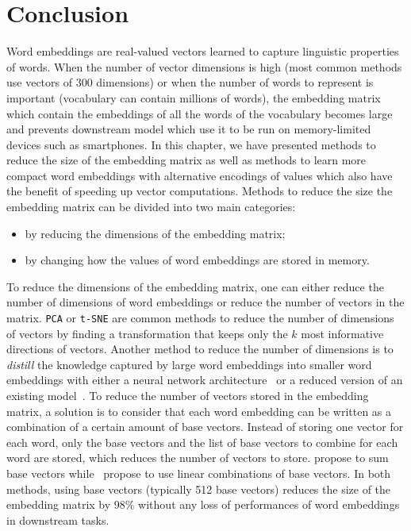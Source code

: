 \section{Conclusion}
  Word embeddings are real-valued vectors learned to capture linguistic
  properties of words. When the number of vector dimensions is high (most common
  methods use vectors of 300 dimensions) or when the number of words to
  represent is important (vocabulary can contain millions of words), the
  embedding matrix which contain the embeddings of all the words of the
  vocabulary becomes large and prevents downstream model which use it to be run
  on memory-limited devices such as smartphones. In this chapter, we have
  presented methods to reduce the size of the embedding matrix as well as
  methods to learn more compact word embeddings with alternative encodings of
  values which also have the benefit of speeding up vector computations. Methods
  to reduce the size the embedding matrix can be divided into two main
  categories:

  \begin{itemize}
    \item by reducing the dimensions of the embedding matrix;
    \item by changing how the values of word embeddings are stored in memory.
  \end{itemize}
  To reduce the dimensions of the embedding matrix, one can either reduce the
  number of dimensions of word embeddings or reduce the number of vectors in the
  matrix. \texttt{PCA} \citep{pearson1901pca} or \texttt{t-SNE}
  \citep{maaten2008visualizing} are common methods to reduce the number of
  dimensions of vectors by finding a transformation that keeps only the $k$ most
  informative directions of vectors. Another method to reduce the number of
  dimensions is to \textit{distill} the knowledge captured by large word
  embeddings into smaller word embeddings with either a neural network
  architecture~\citep{mou2016distilling} or a reduced version of an existing
  model~\citep{sanh2019distilbert}. To reduce the number of vectors stored in
  the embedding matrix, a solution is to consider that each word embedding can
  be written as a combination of a certain amount of base vectors. Instead of
  storing one vector for each word, only the base vectors and the list of base
  vectors to combine for each word are stored, which reduces the number of
  vectors to store. \citet{shu2018compressing} propose to sum base vectors
  while~\citet{chen2018kway} propose to use linear combinations of base vectors.
  In both methods, using base vectors (typically 512 base vectors) reduces the
  size of the embedding matrix by $98\%$ without any loss of performances of
  word embeddings in downstream tasks.\medskip

